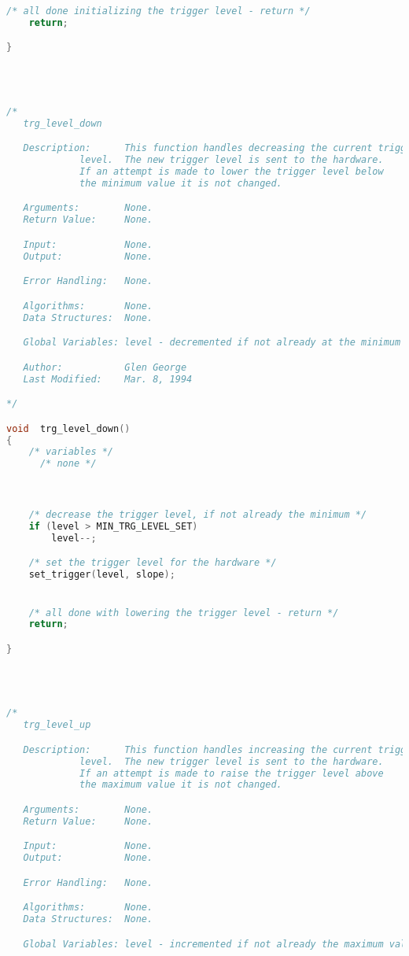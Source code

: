 \begin{lstlisting}[language=C]
    /* all done initializing the trigger level - return */
    return;

}




/*
   trg_level_down

   Description:      This function handles decreasing the current trigger
   		     level.  The new trigger level is sent to the hardware.
		     If an attempt is made to lower the trigger level below
		     the minimum value it is not changed.

   Arguments:        None.
   Return Value:     None.

   Input:            None.
   Output:           None.

   Error Handling:   None.

   Algorithms:       None.
   Data Structures:  None.

   Global Variables: level - decremented if not already at the minimum value.

   Author:           Glen George
   Last Modified:    Mar. 8, 1994

*/

void  trg_level_down()
{
    /* variables */
      /* none */



    /* decrease the trigger level, if not already the minimum */
    if (level > MIN_TRG_LEVEL_SET)
        level--;

    /* set the trigger level for the hardware */
    set_trigger(level, slope);


    /* all done with lowering the trigger level - return */
    return;

}




/*
   trg_level_up

   Description:      This function handles increasing the current trigger
   		     level.  The new trigger level is sent to the hardware.
		     If an attempt is made to raise the trigger level above
		     the maximum value it is not changed.

   Arguments:        None.
   Return Value:     None.

   Input:            None.
   Output:           None.

   Error Handling:   None.

   Algorithms:       None.
   Data Structures:  None.

   Global Variables: level - incremented if not already the maximum value.


\end{lstlisting}
